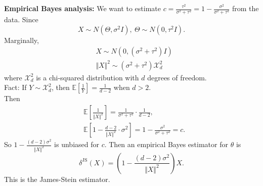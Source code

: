 \documentclass[a4paper]{article}
\begin{document}
\begin{center}
\end{center}
\textbf{Empirical Bayes analysis:} We want to estimate $c = \frac{\tau^2}{\sigma^2+\tau^2} = 1 - \frac{\sigma^2}{\sigma^2+\tau^2}$ from the data. Since
\begin{equation*}
	X \sim N(\Theta,\sigma^2I), \ \Theta \sim N(0,\tau^2I).
\end{equation*}
Marginally,
\begin{equation*}
	\begin{aligned}
		& X \sim N(0,(\sigma^2 + \tau^2) I) \\
		& \Vert X \Vert^2 \sim (\sigma^2 + \tau^2) \mathcal{X}_d^2
	\end{aligned}
\end{equation*}
where $\mathcal{X}_d^2$ is a chi-squared distribution with $d$ degrees of freedom.\\
\newline
Fact: If $Y \sim \mathcal{X}_d^2$, then $\mathbb{E}\left[\frac{1}{Y}\right] = \frac{1}{d-2}$ when $d > 2$.\\
Then
\begin{equation}
	\begin{aligned}
		& \mathbb{E}\left[\frac{1}{\Vert X \Vert^2}\right] = \frac{1}{\sigma^2 + \tau^2} \cdot \frac{1}{d-2}, \\
		& \mathbb{E}\left[1 - \frac{d-2}{\Vert X \Vert^2} \cdot \sigma^2\right] = 1- \frac{\sigma^2}{\sigma^2 + \tau^2} = c.
	\end{aligned}
\end{equation}
So $1 - \frac{(d-2)\sigma^2}{\Vert X \Vert^2}$ is unbiased for $c$. Then an empirical Bayes estimator for $\theta$ is
\begin{equation}
	\delta^{\text{JS}}(X) = \left(1 - \frac{(d-2)\sigma^2}{\Vert X \Vert^2}\right) X.
\end{equation}
This is the James-Stein estimator.
\end{document}
